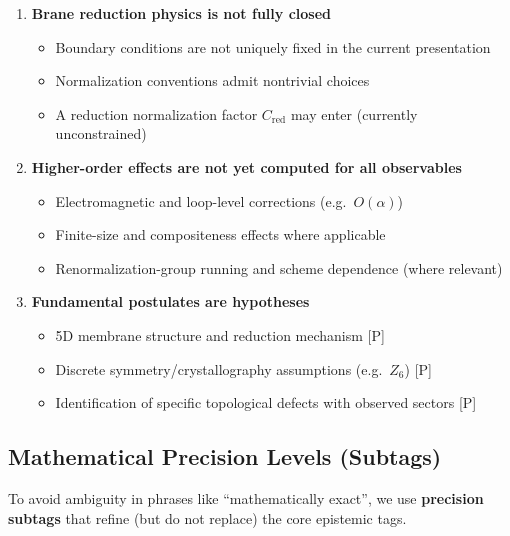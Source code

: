 \begin{enumerate}
\item \textbf{Brane reduction physics is not fully closed}
\begin{itemize}
\item Boundary conditions are not uniquely fixed in the current presentation
\item Normalization conventions admit nontrivial choices
\item A reduction normalization factor $C_{\mathrm{red}}$ may enter (currently unconstrained)
\end{itemize}

\item \textbf{Higher-order effects are not yet computed for all observables}
\begin{itemize}
\item Electromagnetic and loop-level corrections (e.g.\ $O(\alpha)$)
\item Finite-size and compositeness effects where applicable
\item Renormalization-group running and scheme dependence (where relevant)
\end{itemize}

\item \textbf{Fundamental postulates are hypotheses}
\begin{itemize}
\item 5D membrane structure and reduction mechanism [P]
\item Discrete symmetry/crystallography assumptions (e.g.\ $Z_6$) [P]
\item Identification of specific topological defects with observed sectors [P]
\end{itemize}
\end{enumerate}

\subsection*{Mathematical Precision Levels (Subtags)}

To avoid ambiguity in phrases like ``mathematically exact'', we use \textbf{precision subtags}
that refine (but do not replace) the core epistemic tags.

